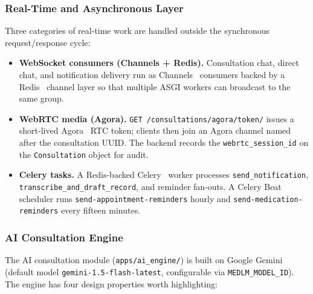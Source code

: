 \subsubsection*{Real-Time and Asynchronous Layer}

Three categories of real-time work are handled outside the synchronous request/response cycle:

\begin{itemize}
  \item \textbf{WebSocket consumers (Channels + Redis).} Consultation chat, direct chat, and notification delivery run as Channels~\cite{channels_docs} consumers backed by a Redis~\cite{redis_docs} channel layer so that multiple ASGI workers can broadcast to the same group.
  \item \textbf{WebRTC media (Agora).} \texttt{GET /consultations/agora/token/} issues a short-lived Agora~\cite{agora_docs} RTC token; clients then join an Agora channel named after the consultation UUID. The backend records the \texttt{webrtc\_session\_id} on the \texttt{Consultation} object for audit.
  \item \textbf{Celery tasks.} A Redis-backed Celery~\cite{celery_docs} worker processes \texttt{send\_notification}, \texttt{transcribe\_and\_draft\_record}, and reminder fan-outs. A Celery Beat scheduler runs \texttt{send-appointment-reminders} hourly and \texttt{send-medication-reminders} every fifteen minutes.
\end{itemize}

\subsubsection*{AI Consultation Engine}

The AI consultation module (\texttt{apps/ai\_engine/}) is built on Google Gemini~\cite{gemini_docs} (default model \texttt{gemini-1.5-flash-latest}, configurable via \texttt{MEDLM\_MODEL\_ID}). The engine has four design properties worth highlighting:


